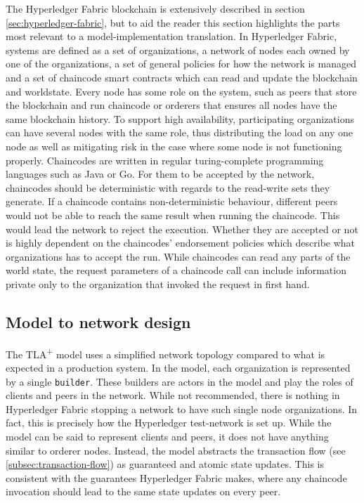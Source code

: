 The Hyperledger Fabric blockchain is extensively described in section \ref{sec:hyperledger-fabric}, but to aid the reader this section highlights the parts most relevant to a model-implementation translation. In Hyperledger Fabric, systems are defined as a set of organizations, a network of nodes each owned by one of the organizations, a set of general policies for how the network is managed and a set of chaincode smart contracts which can read and update the blockchain and worldstate. Every node has some role on the system, such as peers that store the blockchain and run chaincode or orderers that ensures all nodes have the same blockchain history. To support high availability, participating organizations can have several nodes with the same role, thus distributing the load on any one node as well as mitigating risk in the case where some node is not functioning properly. Chaincodes are written in regular turing-complete programming languages such as Java or Go. For them to be accepted by the network, chaincodes should be deterministic with regards to the read-write sets they generate. If a chaincode contains non-deterministic behaviour, different peers would not be able to reach the same result when running the chaincode. This would lead the network to reject the execution. Whether they are accepted or not is highly dependent on the chaincodes' endorsement policies which describe what organizations has to accept the run. While chaincodes can read any parts of the world state, the request parameters of a chaincode call can include information private only to the organization that invoked the request in first hand.

\subsection{Model to network design}
The TLA\textsuperscript+ model uses a simplified network topology compared to what is expected in a production system. In the model, each organization is represented by a single \texttt{builder}. These builders are actors in the model and play the roles of clients and peers in the network. While not recommended, there is nothing in Hyperledger Fabric stopping a network to have such single node organizations. In fact, this is precisely how the Hyperledger test-network is set up. While the model can be said to represent clients and peers, it does not have anything similar to orderer nodes. Instead, the model abstracts the transaction flow (see \ref{subsec:transaction-flow}) as guaranteed and atomic state updates. This is consistent with the guarantees Hyperledger Fabric makes, where any chaincode invocation should lead to the same state updates on every peer.

